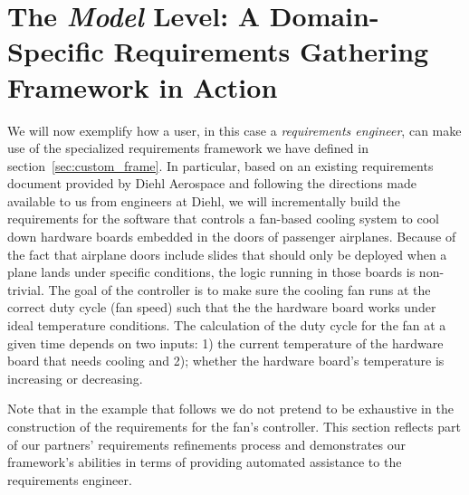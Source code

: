 \section{The \emph{Model} Level: A Domain-Specific Requirements Gathering
Framework in Action}
\label{sec:model}
\vspace{-.2cm}
We will now exemplify how a user, in this case a \emph{requirements engineer},
can make use of the specialized requirements framework we have defined in section~\ref{sec:custom_frame}.
In particular, based on an existing requirements document provided by Diehl
Aerospace and following the directions made available to us from engineers at
Diehl, we will incrementally build the requirements for the software that
controls a fan-based cooling system to cool down hardware boards embedded in
the doors of passenger airplanes.
Because of the fact that airplane doors include slides that should only be
deployed when a plane lands under specific conditions, the logic running in
those boards is non-trivial. The goal of the controller is to make
sure the cooling fan runs at the correct duty cycle (fan speed) such that the 
the hardware board works under ideal temperature conditions. The calculation of
the duty cycle for the fan at a given time depends on two inputs:
1) the current temperature of the hardware board that needs cooling and 2);
whether the hardware board's temperature is increasing or decreasing.
 

Note that in the example that follows we do not pretend to be exhaustive in the
construction of the requirements for the fan's controller. This section
reflects part of our partners' requirements refinements process and demonstrates
our framework's abilities in terms of providing automated assistance to the
requirements engineer. 
\vspace{-.3cm}
